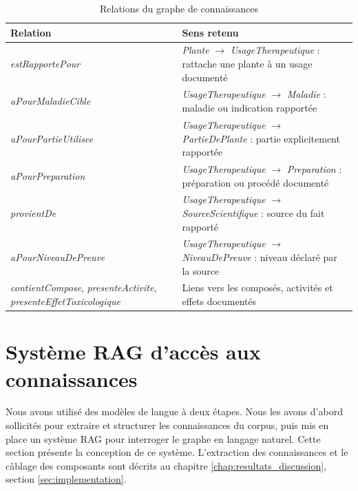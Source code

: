 \begin{table}[H]
\centering
\caption{Relations du graphe de connaissances}
\label{tab:relations_graphe}
\begin{tabular}{|L{6.3cm}|L{7.7cm}|}
\hline
\textbf{Relation} & \textbf{Sens retenu} \\
\hline
\textit{estRapportePour} & \textit{Plante} \(\rightarrow\) \textit{UsageTherapeutique} : rattache une plante à un usage documenté \\
\hline
\textit{aPourMaladieCible} & \textit{UsageTherapeutique} \(\rightarrow\) \textit{Maladie} : maladie ou indication rapportée \\
\hline
\textit{aPourPartieUtilisee} & \textit{UsageTherapeutique} \(\rightarrow\) \textit{PartieDePlante} : partie explicitement rapportée \\
\hline
\textit{aPourPreparation} & \textit{UsageTherapeutique} \(\rightarrow\) \textit{Preparation} : préparation ou procédé documenté \\
\hline
\textit{provientDe} & \textit{UsageTherapeutique} \(\rightarrow\) \textit{SourceScientifique} : source du fait rapporté \\
\hline
\textit{aPourNiveauDePreuve} & \textit{UsageTherapeutique} \(\rightarrow\) \textit{NiveauDePreuve} : niveau déclaré par la source \\
\hline
\textit{contientCompose}, \textit{presenteActivite}, \textit{presenteEffetToxicologique} & Liens vers les composés, activités et effets documentés \\
\hline
\end{tabular}
\end{table}


\section{Système RAG d'accès aux connaissances}
\label{sec:integration_ia}
\label{subsec:systeme_rag}

Nous avons utilisé des modèles de langue à deux étapes. Nous les avons d'abord sollicités pour extraire et structurer les connaissances du corpus, puis mis en place un système RAG pour interroger le graphe en langage naturel. Cette section présente la conception de ce système. L'extraction des connaissances et le câblage des composants sont décrits au chapitre \ref{chap:resultats_discussion}, section \ref{sec:implementation}.

